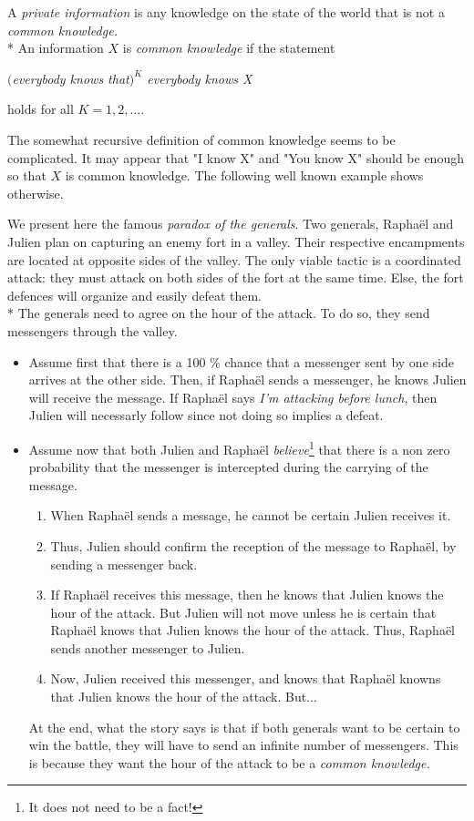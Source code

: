 \begin{definition}
A \emph{private information} is any knowledge on the state of the world that is not a \emph{common knowledge.}\\*
An information $X$ is \emph{common knowledge} if the statement 
\begin{center}
\emph{$($everybody knows that$)^K$ everybody knows X}
\end{center}
holds for all $K = 1, 2, \ldots$.
\end{definition}
 
 The somewhat recursive definition of common knowledge seems to be complicated. 
 It may appear that "I know X" and "You know X" should be enough so that $X$ is common knowledge. The following well known example shows otherwise.
 
 \begin{example}
 We present here the famous \emph{paradox of the generals}.
 Two generals, Rapha\"el and Julien plan on capturing an enemy fort in a valley.
 Their respective encampments are located at opposite sides of the valley.
 The only viable tactic is a coordinated attack: they must attack on both sides of the fort at the same time. Else, the fort defences will organize and easily defeat them. \\*
 The generals need to agree on the hour of the attack. To do so, they send messengers through the valley.
\begin{itemize}
\item Assume first that there is a 100 \% chance that a messenger sent by one side arrives at the other side. Then, if Rapha\"el sends a messenger, he knows Julien will receive the message. If Rapha\"el says \emph{I'm attacking before lunch}, then Julien will necessarly follow since not doing so implies a defeat.
\item Assume now that both Julien and Rapha\"el \emph{believe}\footnote{It does not need to be a fact!} that there is a non zero probability that the messenger is intercepted during the carrying of the message.
\begin{enumerate}
\item When Rapha\"el sends a message, he cannot be certain Julien receives it. \item Thus, Julien should confirm the reception of the message to Rapha\"el, by sending a messenger back.
\item If Rapha\"el receives this message, then he knows that Julien knows the hour of the attack. But Julien will not move unless he is certain that Rapha\"el knows that Julien knows the hour of the attack. Thus, Rapha\"el sends another messenger to Julien.
\item Now, Julien received this messenger, and knows that Rapha\"el knowns that Julien knows the hour of the attack. But...
\end{enumerate}
At the end, what the story says is that if both generals want to be certain to win the battle, they will have to send an infinite number of messengers.
This is because they want the hour of the attack to be a \emph{common knowledge.}
\end{itemize}
\end{example}
 
